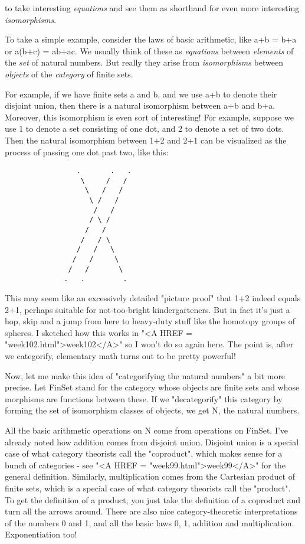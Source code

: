to take interesting \emph{equations} and see them as shorthand for even
more interesting \emph{isomorphisms}.    

To take a simple example, consider the laws of basic arithmetic, like
a+b = b+a or a(b+c) = ab+ac.  We usually think of these as
\emph{equations} between \emph{elements} of the \emph{set} of
natural numbers.  But really they arise from \emph{isomorphisms}
between \emph{objects} of the \emph{category} of finite sets.

For example, if we have finite sets a and b, and we use a+b to 
denote their disjoint union, then there is a natural isomorphism 
between a+b and b+a.   Moreover, this isomorphism is even sort of 
interesting!  For example, suppose we use 1 to denote a set consisting 
of one dot, and 2 to denote a set of two dots.  Then the natural 
isomorphism between 1+2 and 2+1 can be visualized as the process 
of passing one dot past two, like this:

\begin{verbatim}
                 .       .   .
                  \     /   /
                   \   /   /
                    \ /   /
                     /   /
                    / \ /
                   /   /
                  /   / \
                 /   /   \
                /   /     \
               /   /       \
              .   .         .

\end{verbatim}
    
This may seem like an excessively detailed "picture proof"
that 1+2 indeed equals 2+1, perhaps suitable for not-too-bright
kindergarteners.  But in fact it's just a hop, skip and a jump from here
to heavy-duty stuff like the homotopy groups of spheres.  I sketched how
this works in "<A HREF = "week102.html">week102</A>" so I
won't do so again here.  The point is, after we categorify, elementary
math turns out to be pretty powerful!

Now, let me make this idea of "categorifying the natural numbers"
a bit more precise.  Let FinSet stand for the category whose objects
are finite sets and whose morphisms are functions between these.
If we "decategorify" this category by forming the set of isomorphism
classes of objects, we get N, the natural numbers.  

All the basic arithmetic operations on N come from operations on FinSet.
I've already noted how addition comes from disjoint union.  Disjoint
union is a special case of what category theorists call the
"coproduct", which makes sense for a bunch of categories - see
"<A HREF = "week99.html">week99</A>" for the general
definition.  Similarly, multiplication comes from the Cartesian product
of finite sets, which is a special case of what category theorists call
the "product".  To get the definition of a product, you just
take the definition of a coproduct and turn all the arrows around.
There are also nice category-theoretic interpretations of the numbers 0 and 
1, and all the basic laws 0, 1, addition and multiplication.  Exponentiation 
too! 

